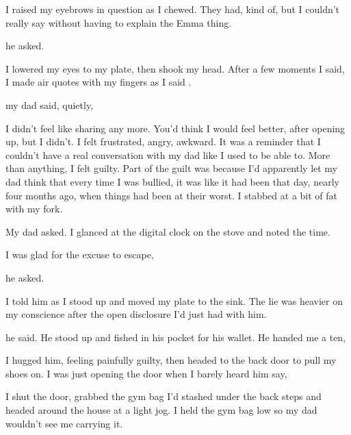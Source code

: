 I raised my eyebrows in question as I chewed. They had, kind of, but I couldn't really say  without having to explain the Emma thing.

 he asked.

I lowered my eyes to my plate, then shook my head. After a few moments I said,  I made air quotes with my fingers as I said .

 my dad said, quietly, 

I didn't feel like sharing any more. You'd think I would feel better, after opening up, but I didn't. I felt frustrated, angry, awkward. It was a reminder that I couldn't have a real conversation with my dad like I used to be able to. More than anything, I felt guilty. Part of the guilt was because I'd apparently let my dad think that every time I was bullied, it was like it had been that day, nearly four months ago, when things had been at their worst. I stabbed at a bit of fat with my fork.

 My dad asked. I glanced at the digital clock on the stove and noted the time.

I was glad for the excuse to escape, 

 he asked.

 I told him as I stood up and moved my plate to the sink. The lie was heavier on my conscience after the open disclosure I'd just had with him.

 he said. He stood up and fished in his pocket for his wallet. He handed me a ten, 

I hugged him, feeling painfully guilty, then headed to the back door to pull my shoes on. I was just opening the door when I barely heard him say, 



I shut the door, grabbed the gym bag I'd stashed under the back steps and headed around the house at a light jog. I held the gym bag low so my dad wouldn't see me carrying it.

